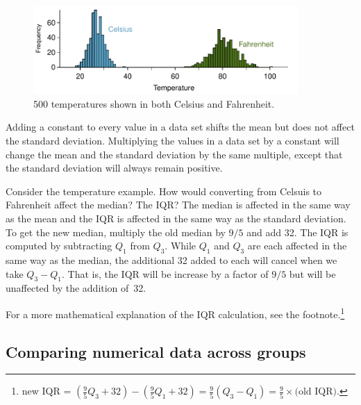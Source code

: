 \begin{figure}[h]
   \centering
   \includegraphics[width=0.9\textwidth]{ch_summarizing_data/figures/CToF_ConversionFigure/CToF_ConversionFigure}
   \caption{500 temperatures shown in both Celsius and \mbox{Fahrenheit.}}
   \label{CToF_ConversionFigure}
\end{figure}


\begin{termBox}{
Adding a constant to every value in a data set shifts the mean but does not affect the standard deviation. Multiplying the values in a data set by a constant will change the mean and the standard deviation by the same multiple, except that the standard deviation will always remain positive.}
\end{termBox}

\begin{example}{Consider the temperature example. How would converting from Celsuis to Fahrenheit affect the median? The IQR?}
The median is affected in the same way as the mean and the IQR is affected in the same way as the standard deviation. To get the new median, multiply the old median by $9/5$ and add 32. The IQR is computed by subtracting $Q_1$ from $Q_3$. While $Q_1$ and $Q_3$ are each affected in the same way as the median, the additional 32 added to each will cancel when we take $Q_3 - Q_1$. That is, the IQR will be increase by a factor of $9/5$ but will be unaffected by the addition of~32.

For a more mathematical explanation of the IQR calculation, see the footnote.\footnote{new IQR = $\left(\frac{9}{5} Q_3 + 32\right) - \left(\frac{9}{5} Q_1 + 32\right) = \frac{9}{5} \left(Q_3 - Q_1\right) = \frac{9}{5} \times \text{(old IQR)}$.}
\end{example}

\subsection{Comparing numerical data across groups}
\label{comparingAcrossGroups}

